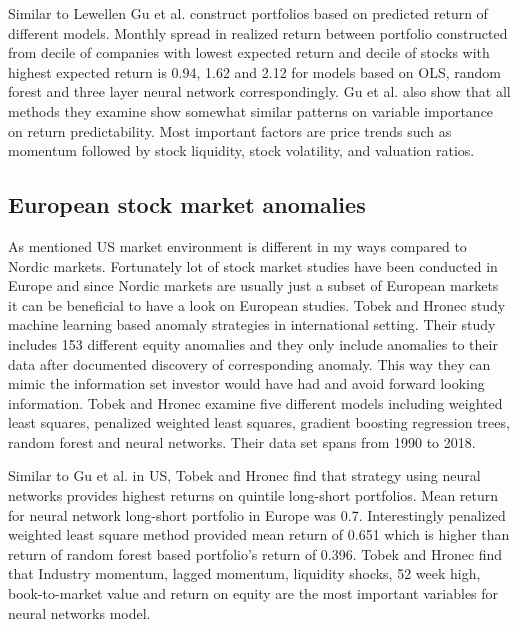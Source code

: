 \documentclass{article}
\begin{document}
Similar to Lewellen \citeyear{Lewellen2015} Gu et al. construct portfolios based on predicted return of different models. Monthly spread in realized return between portfolio constructed from decile of companies with lowest expected return and decile of stocks with highest expected return \footnotemark is 0.94, 1.62 and 2.12 for models based on OLS, random forest and three layer neural network correspondingly. Gu et al. also show that all methods they examine show somewhat similar patterns on variable importance on return predictability. Most important factors are price trends such as momentum followed by stock liquidity, stock volatility, and valuation ratios. \par


\subsection{European stock market anomalies}\label{EuropeanStockMarketAnomalies}

As mentioned US market environment is different in my ways compared to Nordic markets. Fortunately lot of stock market studies have been conducted in Europe and since Nordic markets are usually just a subset of European markets it can be beneficial to have a look on European studies. Tobek and Hronec \citeyear{TOBEK2021100588} study machine learning based anomaly strategies in international setting. Their study includes 153 different equity anomalies and they only include anomalies to their data after documented discovery of corresponding anomaly. This way they can mimic the information set investor would have had and avoid forward looking information. Tobek and Hronec examine five different models including weighted least squares, penalized weighted least squares, gradient boosting regression trees, random forest and neural networks. Their data set spans from 1990 to 2018. \par

Similar to Gu et al. \citeyear{guetal} in US, Tobek and Hronec find that strategy using neural networks provides highest returns on quintile long-short portfolios. Mean return for neural network long-short portfolio in Europe was 0.7. Interestingly penalized weighted least square method provided mean return of 0.651 which is higher than return of random forest based portfolio's return of 0.396. Tobek and Hronec find that Industry momentum, lagged momentum, liquidity shocks, 52 week high, book-to-market value and return on equity are the most important variables for neural networks model.\footnotemark \par
\end{document}

